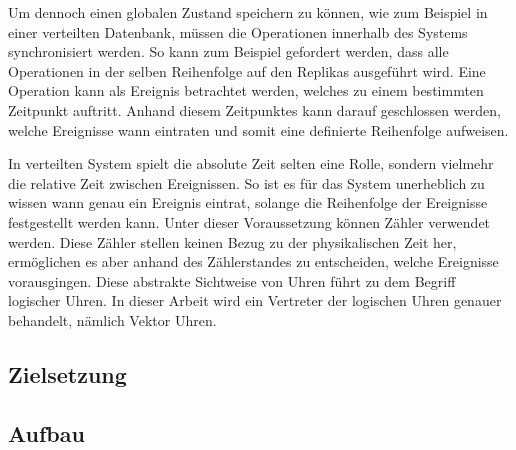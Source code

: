 Um dennoch einen globalen Zustand speichern zu können, wie zum Beispiel in einer verteilten Datenbank, müssen die Operationen innerhalb des Systems synchronisiert werden. So kann zum Beispiel gefordert werden, dass alle Operationen in der selben Reihenfolge auf den Replikas ausgeführt wird. Eine Operation kann als Ereignis betrachtet werden, welches zu einem bestimmten Zeitpunkt auftritt. Anhand diesem Zeitpunktes kann darauf geschlossen werden, welche Ereignisse wann eintraten und somit eine definierte Reihenfolge aufweisen.

In verteilten System spielt die absolute Zeit selten eine Rolle, sondern vielmehr die relative Zeit zwischen Ereignissen.
So ist es für das System unerheblich zu wissen wann genau ein Ereignis eintrat, solange die Reihenfolge der Ereignisse festgestellt werden kann. Unter dieser Voraussetzung können Zähler verwendet werden. Diese Zähler stellen keinen Bezug zu der physikalischen Zeit her, ermöglichen es aber anhand des Zählerstandes zu entscheiden, welche Ereignisse vorausgingen.
Diese abstrakte Sichtweise von Uhren führt zu dem Begriff logischer Uhren. In dieser Arbeit wird ein Vertreter der logischen Uhren genauer behandelt, nämlich Vektor Uhren.


\subsection{Zielsetzung}
\subsection{Aufbau}

    
  

